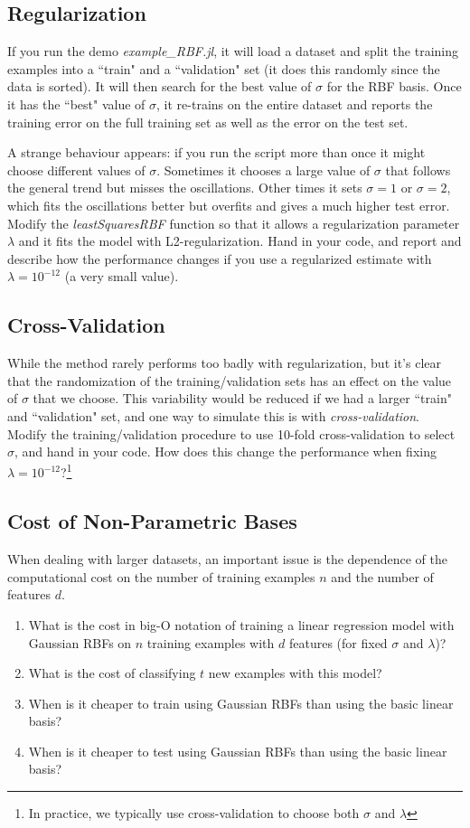 \documentclass{article}
\def\blu#1{{\color{blu}#1}}
\def\enum#1{\begin{enumerate}#1\end{enumerate}}
\begin{document}
\subsection{Regularization}

If you run the demo \emph{example\_RBF.jl}, it will load a dataset and split the training examples into a ``train" and a ``validation" set (it does this randomly since the data is sorted). It will then search for the best value of $\sigma$ for the RBF basis. Once it has the ``best" value of $\sigma$, it re-trains on the entire dataset and reports the training error on the full training set as well as the error on the test set.

A strange behaviour appears: if you run the script more than once it might choose different values of $\sigma$. Sometimes it chooses a large value of $\sigma$ that follows the general trend but misses the oscillations. Other times it sets $\sigma = 1$ or $\sigma=2$, which fits the oscillations better but overfits and gives a much higher test error. \blu{Modify the \emph{leastSquaresRBF} function so that it allows a regularization parameter $\lambda$ and it fits the model with L2-regularization. Hand in your code, and report and describe how the performance changes if you use a regularized estimate with $\lambda = 10^{-12}$ (a very small value).}



\subsection{Cross-Validation}

While the method rarely performs too badly with regularization, but it's clear that the randomization of the training/validation sets has an effect on the value of $\sigma$ that we choose. This variability would be reduced if we had a larger ``train" and ``validation" set, and one way to simulate this is with \emph{cross-validation}. \blu{Modify the training/validation procedure to use 10-fold cross-validation to select $\sigma$, and hand in your code. How does this change the performance when fixing $\lambda = 10^{-12}$?}\footnote{In practice, we typically use cross-validation to choose both $\sigma$ and $\lambda$}

\subsection{Cost of Non-Parametric Bases}

When dealing with larger datasets, an important issue is the dependence of the computational cost on the number of training examples $n$ and the number of features $d$. 
\blu{
\enum{
\item What is the cost in big-O notation of training a linear regression model with Gaussian RBFs on $n$ training examples with $d$ features (for fixed $\sigma$ and $\lambda$)? 
\item What is the cost of classifying $t$ new examples with this model? 
\item When is it cheaper to train using Gaussian RBFs than using the basic linear basis? 
\item When is it cheaper to test using Gaussian RBFs than using the basic linear basis?
}}
\end{document}

